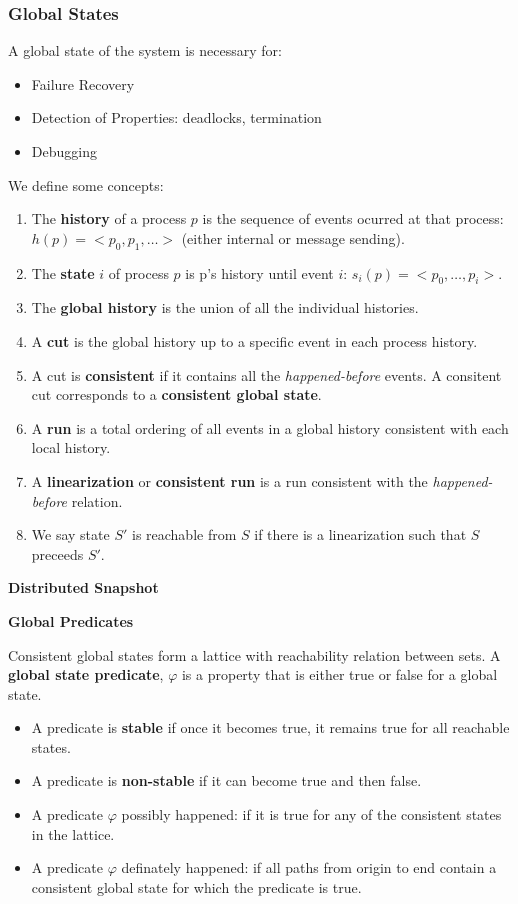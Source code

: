 \subsubsection*{Global States}
A global state of the system is necessary for:
\begin{itemize}
    \item Failure Recovery
    \item Detection of Properties: deadlocks, termination
    \item Debugging
\end{itemize}
We define some concepts:
\begin{enumerate}
    \item The \textbf{history} of a process $p$ is the sequence of events ocurred at that process: $h(p) = <p_0, p_1, \dots>$ (either internal or message sending).
    \item The \textbf{state} $i$ of process $p$ is p's history until event $i$: $s_i(p) = <p_0, \dots, p_i>$.
    \item The \textbf{global history} is the union of all the individual histories.
    \item A \textbf{cut} is the global history up to a specific event in each process history.
    \item A cut is \textbf{consistent} if it contains all the \textit{happened-before} events. A consitent cut corresponds to a \textbf{consistent global state}.
    \item A \textbf{run} is a total ordering of all events in a global history consistent with each local history.
    \item A \textbf{linearization} or \textbf{consistent run} is a run consistent with the \textit{happened-before} relation.
    \item We say state $S'$ is reachable from $S$ if there is a linearization such that $S$ preceeds $S'$.
\end{enumerate}

\textbf{Distributed Snapshot}

\textbf{Global Predicates}

Consistent global states form a lattice with reachability relation between sets.
A \textbf{global state predicate}, $\varphi$ is a property that is either true or false for a global state.
\begin{itemize}
    \item A predicate is \textbf{stable} if once it becomes true, it remains true for all reachable states.
    \item A predicate is \textbf{non-stable} if it can become true and then false.
    \item A predicate $\varphi$ possibly happened: if it is true for any of the consistent states in the lattice.
    \item A predicate $\varphi$ definately happened: if all paths from origin to end contain a consistent global state for which the predicate is true.
\end{itemize}

